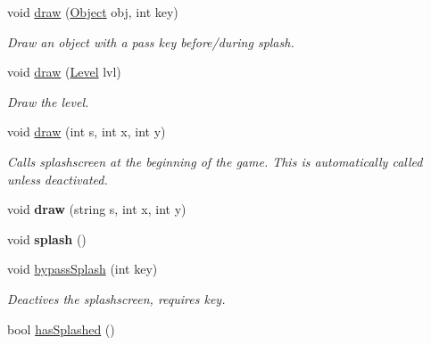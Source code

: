 \begin{DoxyCompactItemize}
\item 
void \hyperlink{classEngine_a81d89df09ee2577fd7deaf2f5e27f93a}{draw} (\hyperlink{classObject}{Object} obj, int key)\hypertarget{classEngine_a81d89df09ee2577fd7deaf2f5e27f93a}{}\label{classEngine_a81d89df09ee2577fd7deaf2f5e27f93a}

\begin{DoxyCompactList}\small\item\em Draw an object with a pass key before/during splash. \end{DoxyCompactList}\item 
void \hyperlink{classEngine_a9435c9399f0d3952032c106e7ee8f6e9}{draw} (\hyperlink{classLevel}{Level} lvl)\hypertarget{classEngine_a9435c9399f0d3952032c106e7ee8f6e9}{}\label{classEngine_a9435c9399f0d3952032c106e7ee8f6e9}

\begin{DoxyCompactList}\small\item\em Draw the level. \end{DoxyCompactList}\item 
void \hyperlink{classEngine_a4eb9f3f3e8207ef4b0dfcc0d1889d176}{draw} (int s, int x, int y)\hypertarget{classEngine_a4eb9f3f3e8207ef4b0dfcc0d1889d176}{}\label{classEngine_a4eb9f3f3e8207ef4b0dfcc0d1889d176}

\begin{DoxyCompactList}\small\item\em Calls splashscreen at the beginning of the game. This is automatically called unless deactivated. \end{DoxyCompactList}\item 
void {\bfseries draw} (string s, int x, int y)\hypertarget{classEngine_ab84c2e814c44d511e12891c60ae66e96}{}\label{classEngine_ab84c2e814c44d511e12891c60ae66e96}

\item 
void {\bfseries splash} ()\hypertarget{classEngine_adb6f1426c5c57f9d60be1e10d8eb2506}{}\label{classEngine_adb6f1426c5c57f9d60be1e10d8eb2506}

\item 
void \hyperlink{classEngine_a3b9cf8a050f43e4e185748f7b2a3ded8}{bypass\+Splash} (int key)\hypertarget{classEngine_a3b9cf8a050f43e4e185748f7b2a3ded8}{}\label{classEngine_a3b9cf8a050f43e4e185748f7b2a3ded8}

\begin{DoxyCompactList}\small\item\em Deactives the splashscreen, requires key. \end{DoxyCompactList}\item 
bool \hyperlink{classEngine_aabab82c2ba4dca772a28dbbd4fe08cb4}{has\+Splashed} ()\hypertarget{classEngine_aabab82c2ba4dca772a28dbbd4fe08cb4}{}\label{classEngine_aabab82c2ba4dca772a28dbbd4fe08cb4}


\end{DoxyCompactItemize}
